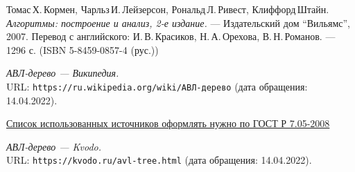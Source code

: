 \begin{thebibliography}{99}

Томас\,Х.\,Кормен, Чарльз\,И.\,Лейзерсон, Рональд\,Л.\,Ривест, Клиффорд\,Штайн.
{\itshape Алгоритмы: построение и анализ, 2-е издание.} --- Издательский дом \enquote{Вильямс}, 2007. Перевод с английского: И.\,В.\,Красиков, Н.\,А.\,Орехова, В.\,Н.\,Романов. --- 1296 с. (ISBN 5-8459-0857-4 (рус.))

{\itshape АВЛ-дерево — Википедия.} \\URL: \texttt{https://ru.wikipedia.org/wiki/АВЛ-дерево} (дата обращения: 14.04.2022).

\href{http://www.ifap.ru/library/gost/7052008.pdf}{Список использованных источников оформлять нужно по  ГОСТ Р 7.05-2008}

{\itshape АВЛ-дерево — Kvodo.} \\URL:
\texttt{https://kvodo.ru/avl-tree.html} (дата обращения: 14.04.2022).

\end{thebibliography}
\pagebreak